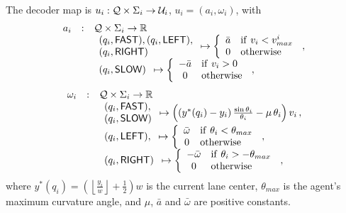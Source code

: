 The decoder map is $u_i :  \mathcal{Q} \times \Sigma_i \rightarrow \mathcal{U}_i$, $u_i = (a_i, \omega_i)$, with
\begin{equation*}
\begin{array}{rcl}
a_i  & : & \Q \times \Sigma_i \rightarrow \real \\
& & \begin{array}{l} (q_i, \mfast), (q_i, \mleft), \\ (q_i, \mright) \end{array}
\mapsto 
\left \lbrace
\begin{array}{cl}
\bar{a} & \mathrm{if} \ v_i < v_{max}^i \\
0 & \mathrm{otherwise}
\end{array}
\right. \, ,
\\
& & \begin{array}{l} (q_i, \mslow) \end{array} 
\mapsto 
\left \lbrace
\begin{array}{cl}
-\bar{a} & \mathrm{if} \ v_i > 0 \\
0 & \mathrm{otherwise}
\end{array}
\right. \, ,
\end{array}
\end{equation*}
\begin{equation*}
\begin{array}{rcl}
\omega_i  & : & \Q \times \Sigma_i \rightarrow \real \\
& & \begin{array}{l} (q_i, \mfast), \\ (q_i, \mslow) \end{array}
\mapsto 
\left( \left( y^*(q_i) - y_i \right) \frac{\sin\theta_i}{\theta_i} - \mu \, \theta_i \right) v_i \, , \\
& &  \begin{array}{l}  (q_i, \mleft), \end{array} \mapsto 
\left \lbrace
\begin{array}{cl}
\bar{\omega} & \mathrm{if} \ \theta_i < \theta_{max} \\
0 & \mathrm{otherwise}
\end{array}
\right. \, , 
\\
& &  \begin{array}{l} (q_i, \mright)  \end{array} \mapsto 
\left \lbrace
\begin{array}{cl}
-\bar{\omega} & \mathrm{if} \ \theta_i > - \theta_{max} \\
0 & \mathrm{otherwise}
\end{array}
\right. \, ,
\end{array} 
\end{equation*}
where $y^*(q_i) = \left( \left\lfloor \frac{y_i}{w} \right\rfloor + \frac{1}{2} \right) w$ is the current lane center, $\theta_{max}$ is the agent's maximum curvature angle, and $\mu$, $\bar{a}$ and $\bar{\omega}$ are positive constants.

